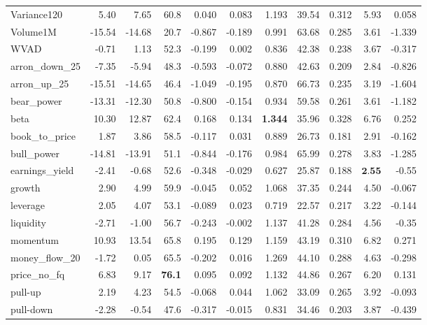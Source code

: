\documentclass[preprint,12pt]{elsarticle}
\begin{document}
{\begin{longtable}{lrrrrrrrrrr}
    Variance120 &   5.40 &  7.65 &   60.8 &   0.040 & 0.083 & 1.193 &     39.54 & 0.312 & 5.93  & 0.058 \\
    Volume1M &   -15.54 &  -14.68 &   20.7 &   -0.867 & -0.189 & 0.991 &     63.68 & 0.285 & 3.61 &  -1.339\\
    WVAD &   -0.71 &  1.13 &   52.3 &   -0.199 & 0.002 & 0.836 &     42.38 & 0.238 & 3.67 & -0.317 \\
    arron\_down\_25 &   -7.35 &  -5.94 &   48.3 &   -0.593 & -0.072 & 0.880 &     42.63 & 0.209 & 2.84 & -0.826  \\
    arron\_up\_25 &   -15.51 &  -14.65 &   46.4 &   -1.049 & -0.195 & 0.870 &     66.73 & 0.235 & 3.19 & -1.604 \\
    bear\_power &   -13.31 &  -12.30 &   50.8 &   -0.800 & -0.154 & 0.934 &     59.58 & 0.261 & 3.61 & -1.182 \\
    beta &   10.30 &  12.87 &   62.4 &   0.168 & 0.134 & \textbf{1.344} &     35.96 & 0.328 & 6.76 & 0.252 \\
    book\_to\_price &   1.87 &  3.86 &   58.5 &   -0.117 & 0.031 & 0.889 &     26.73 & 0.181 & 2.91 & -0.162 \\
    bull\_power &   -14.81 &  -13.91 &   51.1 &   -0.844 & -0.176 & 0.984 &     65.99 & 0.278  & 3.83 & -1.285 \\
    earnings\_yield &   -2.41 &  -0.68 &   52.6 &   -0.348 & -0.029 & 0.627 &     25.87 & 0.188  & $\textbf{2.55}$ & -0.55\\
    growth &   2.90 &  4.99 &   59.9 &   -0.045 & 0.052 & 1.068 &     37.35 & 0.244  & 4.50 & -0.067\\
    leverage &   2.05 &  4.07 &   53.1 &   -0.089 & 0.023 & 0.719 &     22.57 & 0.217 & 3.22 & -0.144 \\
    liquidity &   -2.71 &  -1.00 &   56.7 &   -0.243 & -0.002 & 1.137 &     41.28 & 0.284  & 4.56 & -0.35\\
    momentum &   10.93 &  13.54 &   65.8 &   0.195 & 0.129 & 1.159 &     43.19 & 0.310 & 6.82 &  0.271\\
    money\_flow\_20 &   -1.72 &  0.05 &   65.5 &   -0.202 & 0.016 & 1.269 &     44.10 & 0.288 & 4.63 & -0.298 \\
    price\_no\_fq &   6.83 &  9.17 &   \textbf{76.1} &   0.095 & 0.092 & 1.132 &     44.86 & 0.267 & 6.20 &  0.131\\
    pull-up &   2.19 &  4.23 &   54.5 &   -0.068 & 0.044 & 1.062 &     33.09 & 0.265 & 3.92 & -0.093 \\
    pull-down &   -2.28 &  -0.54 &   47.6 &   -0.317 & -0.015 & 0.831 &     34.46 & 0.203 & 3.87 & -0.439 \\

\end{longtable}}
\end{document}

